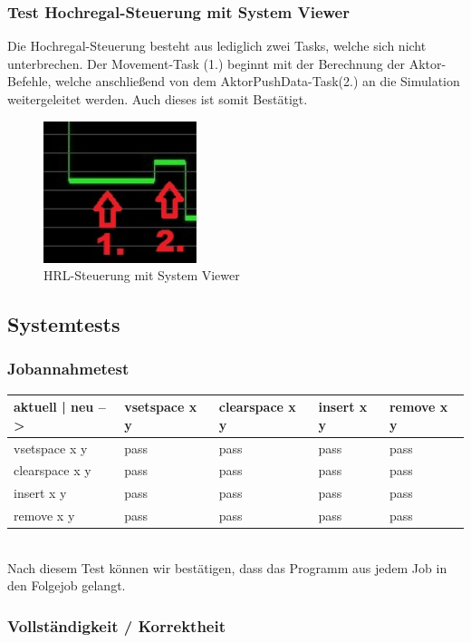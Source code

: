 \subsubsection{Test Hochregal-Steuerung mit System Viewer}
Die Hochregal-Steuerung besteht aus lediglich zwei Tasks, welche sich nicht unterbrechen. Der Movement-Task (1.) beginnt mit der Berechnung der Aktor-Befehle, welche anschließend von dem AktorPushData-Task(2.) an die Simulation weitergeleitet werden. Auch dieses ist somit Bestätigt.
\begin{figure}[H]
	\centering
  \includegraphics[width=0.4\textwidth]{diagrams/steuerung_zeit.jpg}
	\caption{HRL-Steuerung mit System Viewer}
	\label{fig5}
\end{figure}
\subsection {Systemtests}

\subsubsection {Jobannahmetest}
\begin{tabular}{|l|l|l|l|l|}
\hline
 aktuell | neu -->&  vsetspace x y & clearspace x y  & insert x y & remove x y\\
\hline
vsetspace	x y & pass & pass & pass  & pass\\
\hline
clearspace	x y & pass & pass & pass  & pass \\
\hline
insert 		x y & pass & pass & pass & pass\\
\hline
remove	x y & pass & pass & pass & pass\\
\hline
\end{tabular}
\ \\
Nach diesem Test können wir bestätigen, dass das Programm aus jedem Job in den Folgejob gelangt.
\newline

\subsubsection {Vollständigkeit / Korrektheit} 

